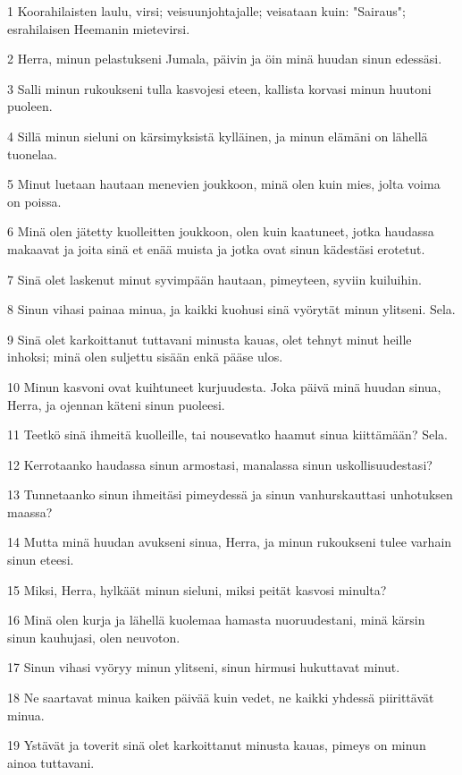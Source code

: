 \par 1 Koorahilaisten laulu, virsi; veisuunjohtajalle; veisataan kuin: "Sairaus"; esrahilaisen Heemanin mietevirsi.
\par 2 Herra, minun pelastukseni Jumala, päivin ja öin minä huudan sinun edessäsi.
\par 3 Salli minun rukoukseni tulla kasvojesi eteen, kallista korvasi minun huutoni puoleen.
\par 4 Sillä minun sieluni on kärsimyksistä kylläinen, ja minun elämäni on lähellä tuonelaa.
\par 5 Minut luetaan hautaan menevien joukkoon, minä olen kuin mies, jolta voima on poissa.
\par 6 Minä olen jätetty kuolleitten joukkoon, olen kuin kaatuneet, jotka haudassa makaavat ja joita sinä et enää muista ja jotka ovat sinun kädestäsi erotetut.
\par 7 Sinä olet laskenut minut syvimpään hautaan, pimeyteen, syviin kuiluihin.
\par 8 Sinun vihasi painaa minua, ja kaikki kuohusi sinä vyörytät minun ylitseni. Sela.
\par 9 Sinä olet karkoittanut tuttavani minusta kauas, olet tehnyt minut heille inhoksi; minä olen suljettu sisään enkä pääse ulos.
\par 10 Minun kasvoni ovat kuihtuneet kurjuudesta. Joka päivä minä huudan sinua, Herra, ja ojennan käteni sinun puoleesi.
\par 11 Teetkö sinä ihmeitä kuolleille, tai nousevatko haamut sinua kiittämään? Sela.
\par 12 Kerrotaanko haudassa sinun armostasi, manalassa sinun uskollisuudestasi?
\par 13 Tunnetaanko sinun ihmeitäsi pimeydessä ja sinun vanhurskauttasi unhotuksen maassa?
\par 14 Mutta minä huudan avukseni sinua, Herra, ja minun rukoukseni tulee varhain sinun eteesi.
\par 15 Miksi, Herra, hylkäät minun sieluni, miksi peität kasvosi minulta?
\par 16 Minä olen kurja ja lähellä kuolemaa hamasta nuoruudestani, minä kärsin sinun kauhujasi, olen neuvoton.
\par 17 Sinun vihasi vyöryy minun ylitseni, sinun hirmusi hukuttavat minut.
\par 18 Ne saartavat minua kaiken päivää kuin vedet, ne kaikki yhdessä piirittävät minua.
\par 19 Ystävät ja toverit sinä olet karkoittanut minusta kauas, pimeys on minun ainoa tuttavani.

